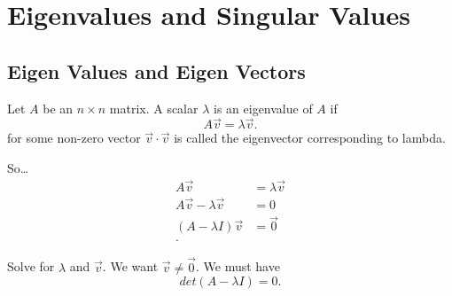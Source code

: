 \section{Eigenvalues and Singular Values}
\subsection{}
\subsection{Eigen Values and Eigen Vectors}

\begin{definition}
  Let $A$ be an $n\times n$ matrix. A scalar $\lambda$ is an eigenvalue of $A$ if 
  \[
  A\vec{v}=\lambda\vec{v}
  .\] 
  for some non-zero vector $\vec{v}\cdot\vec{v}$ is called the eigenvector corresponding to lambda.
\end{definition}
So\ldots
\begin{align*}
  A\vec{v}&=\lambda\vec{v}\\
  A\vec{v}-\lambda\vec{v}&=0\\
  (A-\lambda I)\vec{v}&=\vec{0}\\
.\end{align*}

Solve for $\lambda$ and $\vec{v}$. We want $\vec{v}\neq \vec{0}$. We must have 
\[
  det(A-\lambda I)=0
.\] 
